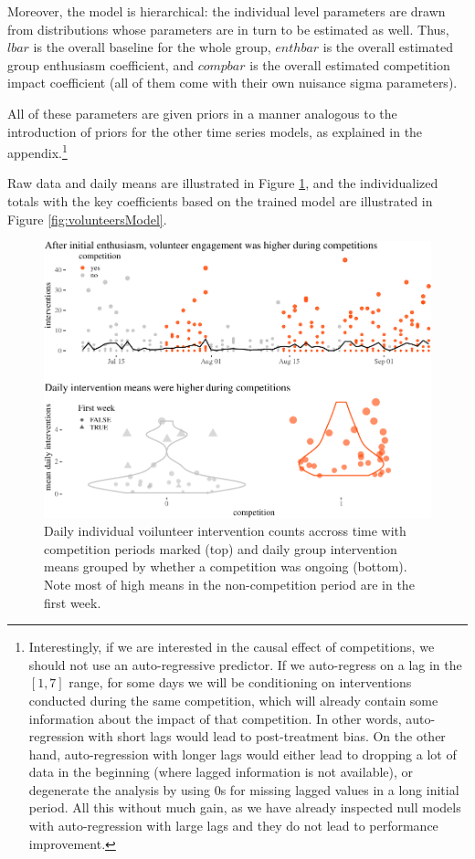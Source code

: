 \documentclass[preprint,12pt]{elsarticle}
\begin{document}
\noindent Moreover, the model is hierarchical: the individual level
parameters are drawn from distributions whose parameters are in turn to
be estimated as well. Thus, \(lbar\) is the overall baseline for the
whole group, \(enthbar\) is the overall estimated group enthusiasm
coefficient, and \(compbar\) is the overall estimated competition impact
coefficient (all of them come with their own nuisance sigma parameters).

\noindent All of these parameters are given priors in a manner analogous
to the introduction of priors for the other time series models, as
explained in the appendix.\footnote{Interestingly, if we are interested
  in the causal effect of competitions, we should not use an
  auto-regressive predictor. If we auto-regress on a lag in the
  \([1,7]\) range, for some days we will be conditioning on
  interventions conducted during the same competition, which will
  already contain some information about the impact of that competition.
  In other words, auto-regression with short lags would lead to
  post-treatment bias. On the other hand, auto-regression with longer
  lags would either lead to dropping a lot of data in the beginning
  (where lagged information is not available), or degenerate the
  analysis by using 0s for missing lagged values in a long initial
  period. All this without much gain, as we have already inspected null
  models with auto-regression with large lags and they do not lead to
  performance improvement.}

Raw data and daily means are illustrated in Figure
\ref{fig:volunteersBasic}, and the individualized totals with the key
coefficients based on the trained model are illustrated in Figure
\ref{fig:volunteersModel}.

\begin{figure}

\begin{center}\includegraphics[width=1\linewidth]{figures/fig:volunteersBasic5-1} \end{center}
\caption{Daily individual voilunteer intervention counts accross time with competition periods marked (top) and daily group intervention means grouped by whether a competition was ongoing (bottom). Note most of high means in the non-competition period are in the first week.}
\label{fig:volunteersBasic}
\end{figure}
\end{document}
